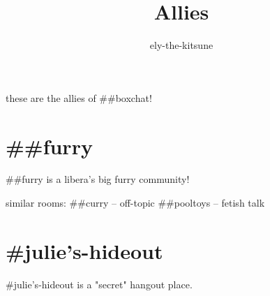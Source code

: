 \title {Allies}
\author {ely-the-kitsune}


  these are the allies of ##boxchat!
  \chapter{##furry}
  ##furry is a libera's big furry community!
  
  similar rooms: 
  ##curry -- off-topic
  ##pooltoys -- fetish talk
  \chapter{#julie's-hideout}
  #julie's-hideout is a "secret" hangout place.

